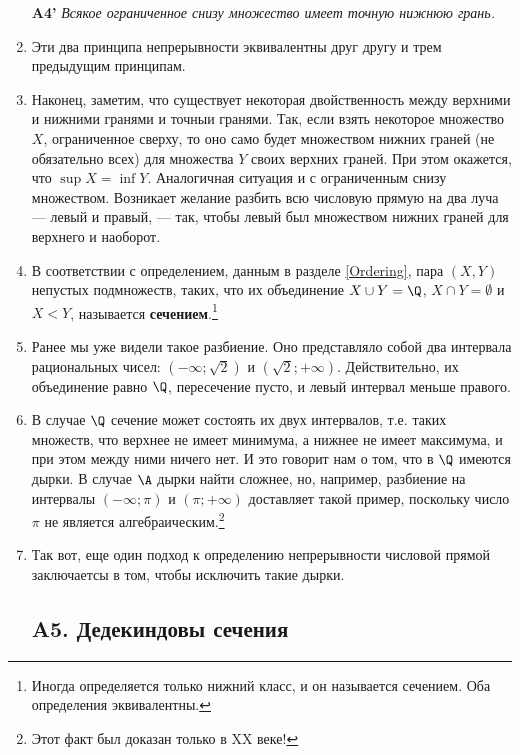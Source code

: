 \begin{enumerate}
\noindent
{\bf A4'} \textit{Всякое ограниченное снизу множество имеет точную нижнюю грань.}
\item Эти два принципа непрерывности эквивалентны друг другу и трем предыдущим принципам.
\item Наконец, заметим, что существует некоторая двойственность между верхними и нижними гранями и точныи гранями. Так, если взять некоторое множество $X$, ограниченное сверху, то оно само будет множеством нижних граней (не обязательно всех) для множества $Y$ своих верхних граней. При этом окажется, что $\sup X=\inf Y$. Аналогичная ситуация и с ограниченным снизу множеством. Возникает желание разбить всю числовую прямую на два луча --- левый и правый, --- так, чтобы левый был множеством нижних граней для верхнего и наоборот.
\item В соответствии с определением, данным в разделе \ref{Ordering},
пара $(X,Y)$ непустых подмножеств, таких, что их объединение $X\cup Y=\Q$, $X\cap Y=\emptyset$ и $X<Y$, называется \textbf{сечением}.\footnote{Иногда определяется только нижний класс, и он называется сечением. Оба определения эквивалентны.}
\item Ранее мы уже видели такое разбиение. Оно представляло собой два интервала рациональных чисел: $(-\infty;\sqrt 2)$ и $(\sqrt 2;+\infty)$. Действительно, их объединение равно $\Q$, пересечение пусто, и левый интервал меньше правого.
\item В случае $\Q$ сечение может состоять их двух интервалов, т.е. таких множеств, что верхнее не имеет минимума, а нижнее не имеет максимума, и при этом между ними ничего нет. И это говорит нам о том, что в $\Q$ имеются дырки. В случае $\A$ дырки найти сложнее, но, например, разбиение на интервалы $(-\infty;\pi)$ и $(\pi;+\infty)$ доставляет такой пример, поскольку число $\pi$ не является алгебраическим.\footnote{Этот факт был доказан только в XX веке!}
\item Так вот, еще один подход к определению непрерывности числовой прямой заключаетсы в том, чтобы исключить такие дырки.

\subsection*{A5. Дедекиндовы сечения}


\end{enumerate}
